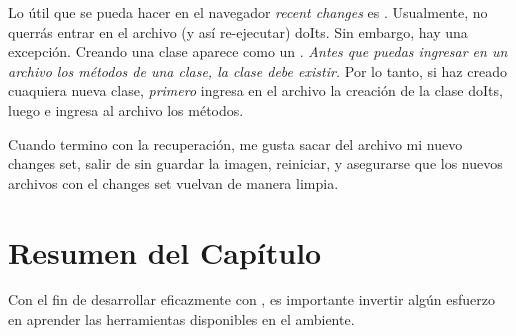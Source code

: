 \documentclass[spanish,a4paper,10pt,twoside]{book}
\begin{document}
Lo \'util que se pueda hacer en el navegador \emph{recent changes} es .
Usualmente, no querr\'as entrar en el archivo (y as\'i re-ejecutar) doIts.
Sin embargo, hay una excepci\'on.
Creando una clase aparece como un .
\emph{Antes que puedas ingresar en un archivo los m\'etodos de una clase, la clase debe existir.}
Por lo tanto, si haz creado cuaquiera nueva clase, \emph{primero} ingresa en el archivo la creaci\'on de la clase doIts, luego  e ingresa al archivo los m\'etodos.

Cuando termino con la recuperaci\'on, me gusta sacar del archivo mi nuevo changes set, salir de \pharo sin guardar la imagen, reiniciar, y asegurarse que los nuevos archivos con el changes set vuelvan de manera limpia.

\section{Resumen del Cap\'itulo}

Con el fin de desarrollar eficazmente con \pharo, es importante invertir alg\'un esfuerzo en aprender las herramientas disponibles en el ambiente.
\end{document}
